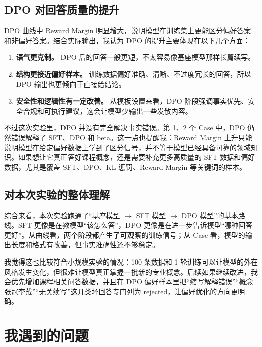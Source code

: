 \documentclass[a4paper,12pt]{ctexart}
\begin{document}
\subsection{DPO 对回答质量的提升}

DPO 曲线中 Reward Margin 明显增大，说明模型在训练集上更能区分偏好答案和非偏好答案。结合实际输出，我认为 DPO 的提升主要体现在以下几个方面：

\begin{enumerate}
    \item \textbf{语气更克制。} DPO 后的回答一般更短，不太容易像基座模型那样长篇续写。
    \item \textbf{结构更接近偏好样本。} 训练数据偏好准确、清晰、不过度冗长的回答，所以 DPO 输出也更倾向于直接给结论。
    \item \textbf{安全性和逻辑性有一定改善。} 从模板设置来看，DPO 阶段强调事实优先、安全合规和可执行建议，这会让模型少输出一些发散内容。
\end{enumerate}

不过这次实验里，DPO 并没有完全解决事实错误。第 1、2 个 Case 中，DPO 仍然错误解释了 SFT、DPO 和 beta。这一点也提醒我：Reward Margin 上升只能说明模型在给定偏好数据上学到了区分信号，并不等于模型已经具备可靠的领域知识。如果想让它真正答好课程概念，还是需要补充更多高质量的 SFT 数据和偏好数据，尤其是覆盖 SFT、DPO、KL 惩罚、Reward Margin 等关键词的样本。

\subsection{对本次实验的整体理解}

综合来看，本次实验跑通了“基座模型 $\rightarrow$ SFT 模型 $\rightarrow$ DPO 模型”的基本路线。SFT 更像是在教模型“该怎么答”，DPO 更像是在进一步告诉模型“哪种回答更好”。从曲线看，两个阶段都产生了可观察的训练信号；从 Case 看，模型的输出长度和格式有改善，但事实准确性还不够稳定。

我觉得这也比较符合小规模实验的情况：100 条数据和 1 轮训练可以让模型的外在风格发生变化，但很难让模型真正掌握一批新的专业概念。后续如果继续改进，我会优先增加课程相关问答数据，并且在 DPO 偏好样本里把“缩写解释错误”“概念张冠李戴”“无关续写”这几类坏回答专门列为 rejected，让偏好优化的方向更明确。

\section{我遇到的问题}

\vspace{10cm}
\end{document}
